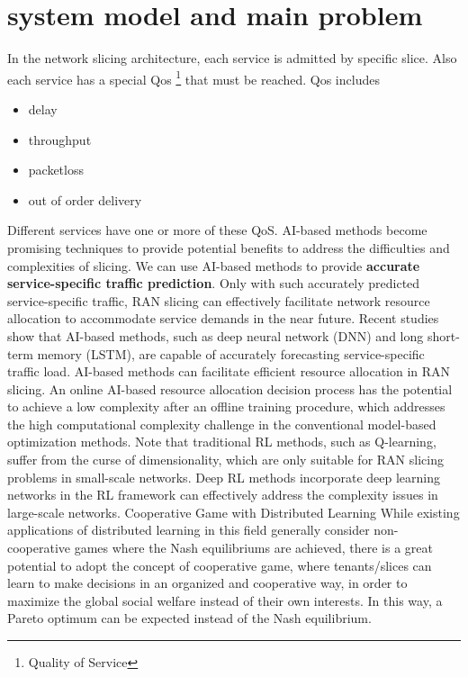 \documentclass{article}
\begin{document}
\section{system model and main problem}
In the network slicing architecture, each service is admitted by specific slice. Also each service has a special Qos \footnote{Quality of Service} that must be reached. 
Qos includes 
\begin{itemize}
\item delay
\item throughput
\item packetloss
\item out of order delivery
\end{itemize}  
Different services have one or more of these QoS.
AI-based methods become promising techniques to provide
potential benefits to address the difficulties and complexities of slicing.
We can use AI-based methods
to provide \textbf{accurate service-specific traffic prediction}.
Only
with such accurately predicted service-specific traffic, RAN
slicing can effectively facilitate network resource allocation to
accommodate service demands in the near future. Recent studies show that AI-based methods, such as deep neural network
(DNN) and long short-term memory (LSTM), are capable of
accurately forecasting service-specific traffic load.
AI-based methods can facilitate efficient resource allocation in RAN slicing. An online AI-based resource allocation decision process has the potential to achieve
a low complexity after an offline training procedure, which
addresses the high computational complexity challenge in the
conventional model-based optimization methods.
 Note that traditional RL methods, such as
Q-learning, suffer from the curse of dimensionality, which are
only suitable for RAN slicing problems in small-scale networks. Deep RL methods incorporate deep learning networks
in the RL framework can effectively address the complexity
issues in large-scale networks. 
Cooperative Game with Distributed Learning
While existing applications of distributed learning in this field generally consider non-cooperative games where the Nash
equilibriums are achieved, there is a great potential to adopt the concept of cooperative game, where tenants/slices can learn to
make decisions in an organized and cooperative way, in order to maximize the global social welfare instead of their own interests.
In this way, a Pareto optimum can be expected instead of the Nash equilibrium.
\end{document}
